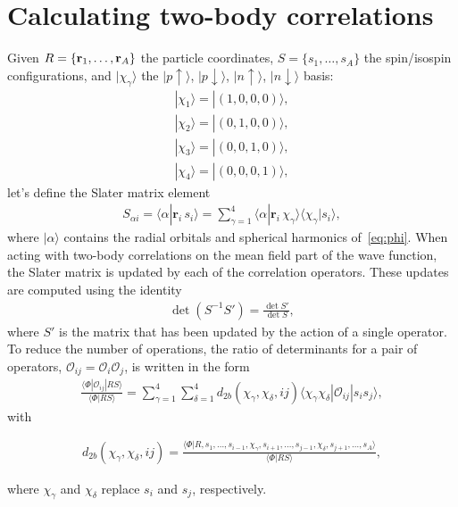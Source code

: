 \documentclass[aps,prc,twocolumn,superscriptaddress,floatfix]{revtex4-1}
\begin{document}
\section{Calculating two-body correlations}
Given $R=\{\vb{r}_1,\dots,\vb{r}_A\}$ the particle coordinates, 
$S=\{s_1,\dots,s_A\}$ the spin/isospin configurations, 
and $|\chi_\gamma\rangle$ the $|p\uparrow\rangle$, $|p\downarrow\rangle$,
$|n\uparrow\rangle$, $|n\downarrow\rangle$ basis:
\begin{align}
	|\chi_1\rangle=|(1,0,0,0)\rangle , \nonumber \\
	|\chi_2\rangle=|(0,1,0,0)\rangle , \nonumber \\
	|\chi_3\rangle=|(0,0,1,0)\rangle , \nonumber \\
	|\chi_4\rangle=|(0,0,0,1)\rangle ,
\end{align}
let's define the Slater matrix element
\begin{align}
   S_{\alpha i}=\langle\alpha|\mathbf{r}_i\,s_i\rangle=\sum_{\gamma=1}^4\langle\alpha|\mathbf{r}_i\,\chi_\gamma\rangle\langle\chi_\gamma|s_i\rangle ,
\end{align}
where $|\alpha\rangle$ contains the radial orbitals and spherical harmonics of~\cref{eq:phi}. 
When acting with two-body correlations on the mean field part of the wave function, 
the Slater matrix is updated by each of the correlation operators. 
These updates are computed using the identity 
\begin{align}
	\det\left(S^{-1}S'\right) = \frac{\det S'}{\det S} ,
	\label{eq:invers}
\end{align}
where $S'$ is the matrix that has been updated by the action of a single operator. 
To reduce the number of operations, the ratio of determinants for a pair of operators, 
$\mathcal{O}_{ij}=\mathcal{O}_i\mathcal{O}_j$, is written in the form
\begin{align}
   \frac{\langle \Phi|\mathcal O_{ij}|RS\rangle }{\langle\Phi|RS\rangle} = \sum_{\gamma=1}^4\sum_{\delta=1}^4 d_{2b}(\chi_\gamma,\chi_\delta,ij)\langle \chi_\gamma\chi_\delta|\mathcal O_{ij}|s_is_j\rangle ,
	\label{eq:ratio}
\end{align}
with
\begin{widetext}
\begin{align}
 d_{2b}(\chi_\gamma,\chi_\delta,ij)=\frac{\langle\Phi|R,s_1,\ldots,s_{i-1},\chi_\gamma,s_{i+1},\ldots,s_{j-1},\chi_\delta,s_{j+1},\ldots,s_A\rangle}{\langle \Phi|RS\rangle} ,
\end{align}
\end{widetext}
where $\chi_\gamma$ and $\chi_\delta$ replace $s_i$ and $s_j$, respectively.
\end{document}

